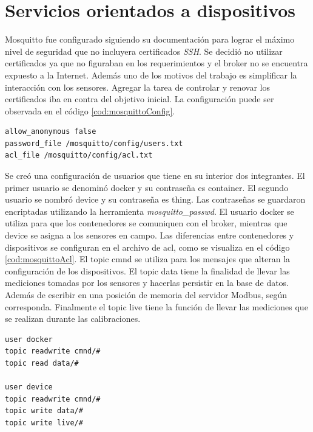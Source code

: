 
\section{Servicios orientados a dispositivos}

Mosquitto fue configurado siguiendo su documentación para lograr el máximo nivel de seguridad que no incluyera certificados \emph{SSH}.
Se decidió no utilizar certificados ya que no figuraban en los requerimientos y el broker no se encuentra expuesto a la Internet.
Además uno de los motivos del trabajo es simplificar la interacción con los sensores.
Agregar la tarea de controlar y renovar los certificados iba en contra del objetivo inicial.
La configuración puede ser observada en el código \ref{cod:mosquittoConfig}.

\begin{lstlisting}[label=cod:mosquittoConfig,caption=Archivo mosquitto.conf]
allow_anonymous false
password_file /mosquitto/config/users.txt
acl_file /mosquitto/config/acl.txt
\end{lstlisting}

Se creó una configuración de usuarios que tiene en su interior dos integrantes.
El primer usuario se denominó docker y su contraseña es container.
El segundo usuario se nombró device y su contraseña es thing.
Las contraseñas se guardaron encriptadas utilizando la herramienta \emph{mosquitto\_passwd}.
El usuario docker se utiliza para que los contenedores se comuniquen con el broker, mientras que device se asigna a los sensores en campo.
Las diferencias entre contenedores y dispositivos se configuran en el archivo de acl, como se visualiza en el código \ref{cod:mosquittoAcl}.
El topic cmnd se utiliza para los mensajes que alteran la configuración de los dispositivos.
El topic data tiene la finalidad de llevar las mediciones tomadas por los sensores y hacerlas persistir en la base de datos.
Además de escribir en una posición de memoria del servidor Modbus, según corresponda.
Finalmente el topic live tiene la función de llevar las mediciones que se realizan durante las calibraciones.

\begin{lstlisting}[label=cod:mosquittoAcl,caption=Lista de control de acceso]
user docker
topic readwrite cmnd/#
topic read data/#

user device
topic readwrite cmnd/#
topic write data/#
topic write live/#
\end{lstlisting}

